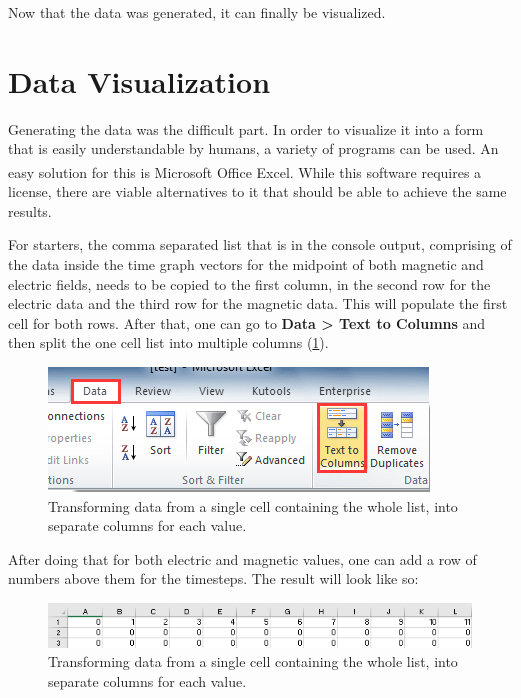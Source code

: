 Now that the data was generated, it can finally be visualized.

\section{Data Visualization}

Generating the data was the difficult part. In order to visualize it into a form that is easily understandable by humans, a variety of programs can be used. An easy solution for this is Microsoft Office Excel\textsuperscript{\cite{excel}}. While this software requires a license, there are viable alternatives to it that should be able to achieve the same results.

For starters, the comma separated list that is in the console output, comprising of the data inside the time graph vectors for the midpoint of both magnetic and electric fields, needs to be copied to the first column, in the second row for the electric data and the third row for the magnetic data. This will populate the first cell for both rows. After that, one can go to \textbf{Data > Text to Columns} and then split the one cell list into multiple columns (\ref{fig:fdtd1dexcel1}).

\begin{figure}[h!]
	\centering
	\includegraphics{Figures/fdtd1dexcel1}
	\decoRule
	\caption[1D Excel - Text to Columns]{Transforming data from a single cell containing the whole list, into separate columns for each value.}
	\label{fig:fdtd1dexcel1}
\end{figure}

After doing that for both electric and magnetic values, one can add a row of numbers above them for the timesteps. The result will look like so:

\begin{figure}[h!]
	\centering
	\includegraphics{Figures/fdtd1dexcel2}
	\decoRule
	\caption[1D Excel - Text to Columns]{Transforming data from a single cell containing the whole list, into separate columns for each value.}
	\label{fig:fdtd1dexcel2}
\end{figure}

